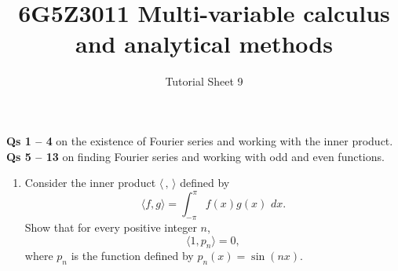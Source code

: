 \documentclass[a4paper]{amsart}
\begin{document}
\title{6G5Z3011 Multi-variable calculus and analytical methods}
\author{Tutorial Sheet 9}
\maketitle

\textbf{Qs 1 -- 4} on the existence of Fourier series and working with the inner product. \\
\textbf{Qs 5 -- 13} on finding Fourier series and working with odd and even functions.

\begin{enumerate}
  \item
  Consider the inner product $\langle \, , \,  \rangle$ defined by 
  $$ \langle f , g \rangle = \int_{- \pi}^\pi f(x)g(x) \, \, dx .$$
  Show that for every positive integer $n$,
  $$ \langle 1 , p_n \rangle = 0,$$
  where $p_n$ is the function defined by $p_n (x) = \sin (nx)$.
  

\end{enumerate}
\end{document}
